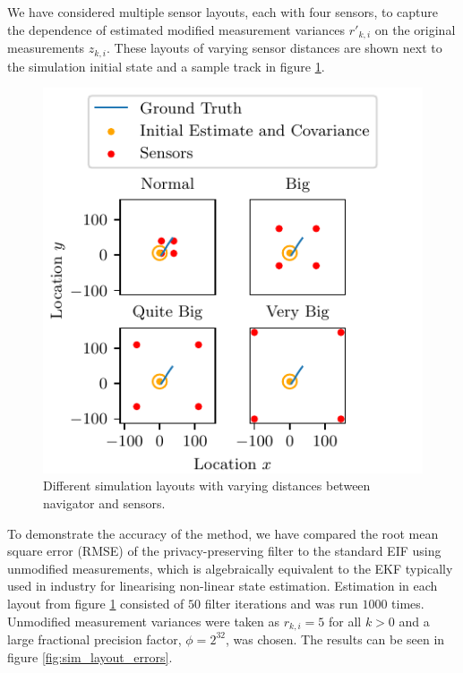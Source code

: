 We have considered multiple sensor layouts, each with four sensors, to capture the dependence of estimated modified measurement variances $r'_{k,i}$ on the original measurements $z_{k,i}$. These layouts of varying sensor distances are shown next to the simulation initial state and a sample track in figure \ref{fig:sim_layouts}.
\begin{figure}[htbp]
    \centering
    \includegraphics{figures/layouts.pdf}
    \caption{Different simulation layouts with varying distances between navigator and sensors.}
    \label{fig:sim_layouts}
\end{figure}
To demonstrate the accuracy of the method, we have compared the root mean square error (RMSE) of the privacy-preserving filter to the standard EIF using unmodified measurements, which is algebraically equivalent to the EKF typically used in industry for linearising non-linear state estimation. Estimation in each layout from figure \ref{fig:sim_layouts} consisted of $50$ filter iterations and was run $1000$ times. Unmodified measurement variances were taken as $r_{k,i}=5$ for all $k>0$ and a large fractional precision factor, $\phi=2^{32}$, was chosen. The results can be seen in figure \ref{fig:sim_layout_errors}.
